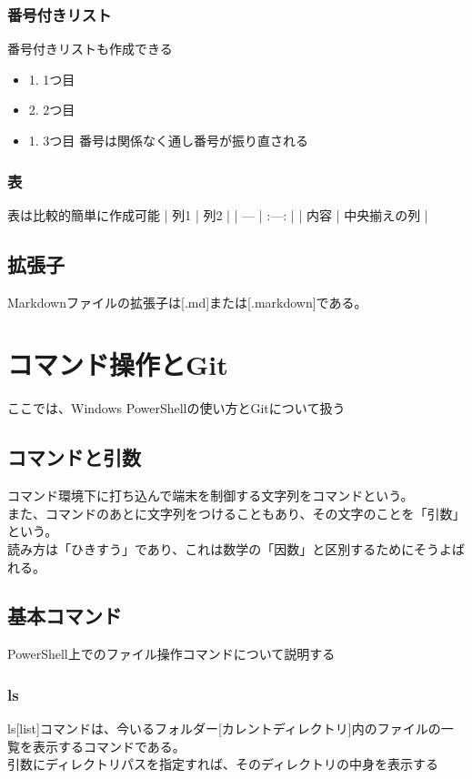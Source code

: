 \documentclass{ltjsarticle}
\begin{document}
\subsubsection{番号付きリスト}
番号付きリストも作成できる
\begin{itemize}
    \item 1. 1つ目
    \item 2. 2つ目
    \item 1. 3つ目 番号は関係なく通し番号が振り直される
\end{itemize}
\subsubsection{表}
表は比較的簡単に作成可能
| 列1 | 列2 |
| --- | :---: |
| 内容 | 中央揃えの列 |
\subsection{拡張子}
Markdownファイルの拡張子は[.md]または[.markdown]である。
\section{コマンド操作とGit}
ここでは、Windows PowerShellの使い方とGitについて扱う
\subsection{コマンドと引数}
コマンド環境下に打ち込んで端末を制御する文字列をコマンドという。\\
また、コマンドのあとに文字列をつけることもあり、その文字のことを「引数」という。\\
読み方は「ひきすう」であり、これは数学の「因数」と区別するためにそうよばれる。
\subsection{基本コマンド}
PowerShell上でのファイル操作コマンドについて説明する
\subsubsection{ls}
ls[list]コマンドは、今いるフォルダー[カレントディレクトリ]内のファイルの一覧を表示するコマンドである。\\
引数にディレクトリパスを指定すれば、そのディレクトリの中身を表示する
\end{document}
